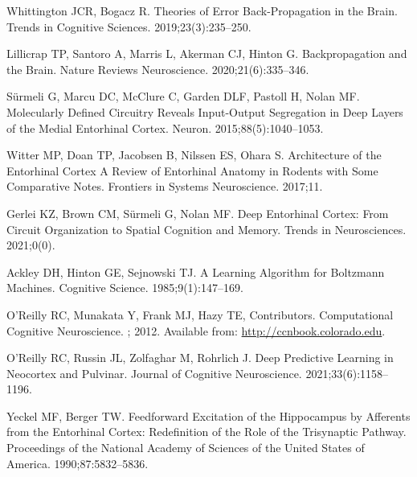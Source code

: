 \documentclass[10pt,letterpaper]{article}
\begin{document}
\begin{thebibliography}{10}
  Whittington JCR, Bogacz R.
  \newblock Theories of Error Back-Propagation in the Brain.
  \newblock Trends in Cognitive Sciences. 2019;23(3):235--250.
  
  Lillicrap TP, Santoro A, Marris L, Akerman CJ, Hinton G.
  \newblock Backpropagation and the Brain.
  \newblock Nature Reviews Neuroscience. 2020;21(6):335--346.
  
  S{\"u}rmeli G, Marcu DC, McClure C, Garden DLF, Pastoll H, Nolan MF.
  \newblock Molecularly {{Defined Circuitry Reveals Input-Output Segregation}} in
    {{Deep Layers}} of the {{Medial Entorhinal Cortex}}.
  \newblock Neuron. 2015;88(5):1040--1053.
  
  Witter MP, Doan TP, Jacobsen B, Nilssen ES, Ohara S.
  \newblock Architecture of the Entorhinal Cortex {{A}} Review of Entorhinal
    Anatomy in Rodents with Some Comparative Notes.
  \newblock Frontiers in Systems Neuroscience. 2017;11.
  
  Gerlei KZ, Brown CM, S{\"u}rmeli G, Nolan MF.
  \newblock Deep Entorhinal Cortex: From Circuit Organization to Spatial
    Cognition and Memory.
  \newblock Trends in Neurosciences. 2021;0(0).
  
  Ackley DH, Hinton GE, Sejnowski TJ.
  \newblock A Learning Algorithm for {{Boltzmann}} Machines.
  \newblock Cognitive Science. 1985;9(1):147--169.
  
  O'Reilly RC, Munakata Y, Frank MJ, Hazy TE, {Contributors}.
  \newblock Computational {{Cognitive Neuroscience}}.
  ; 2012.
  \newblock Available from: \url{http://ccnbook.colorado.edu}.
  
  O'Reilly RC, Russin JL, Zolfaghar M, Rohrlich J.
  \newblock Deep Predictive Learning in Neocortex and Pulvinar.
  \newblock Journal of Cognitive Neuroscience. 2021;33(6):1158--1196.
  
  Yeckel MF, Berger TW.
  \newblock Feedforward Excitation of the Hippocampus by Afferents from the
    Entorhinal Cortex: Redefinition of the Role of the Trisynaptic Pathway.
  \newblock Proceedings of the National Academy of Sciences of the United States
    of America. 1990;87:5832--5836.
  

\end{thebibliography}
\end{document}
